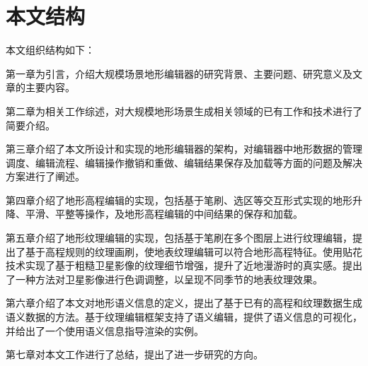 \section{本文结构}
本文组织结构如下：\par
第一章为引言，介绍大规模场景地形编辑器的研究背景、主要问题、研究意义及文章的主要内容。\par
第二章为相关工作综述，对大规模地形场景生成相关领域的已有工作和技术进行了简要介绍。\par
第三章介绍了本文所设计和实现的地形编辑器的架构，对编辑器中地形数据的管理调度、编辑流程、编辑操作撤销和重做、编辑结果保存及加载等方面的问题及解决方案进行了阐述。\par
第四章介绍了地形高程编辑的实现，包括基于笔刷、选区等交互形式实现的地形升降、平滑、平整等操作，及地形高程编辑的中间结果的保存和加载。\par
第五章介绍了地形纹理编辑的实现，包括基于笔刷在多个图层上进行纹理编辑，提出了基于高程规则的纹理画刷，使地表纹理编辑可以符合地形高程特征。使用贴花技术实现了基于粗糙卫星影像的纹理细节增强，提升了近地漫游时的真实感。提出了一种方法对卫星影像进行色调调整，以呈现不同季节的地表纹理效果。\par
第六章介绍了本文对地形语义信息的定义，提出了基于已有的高程和纹理数据生成语义数据的方法。基于纹理编辑框架支持了语义编辑，提供了语义信息的可视化，并给出了一个使用语义信息指导渲染的实例。\par
第七章对本文工作进行了总结，提出了进一步研究的方向。



